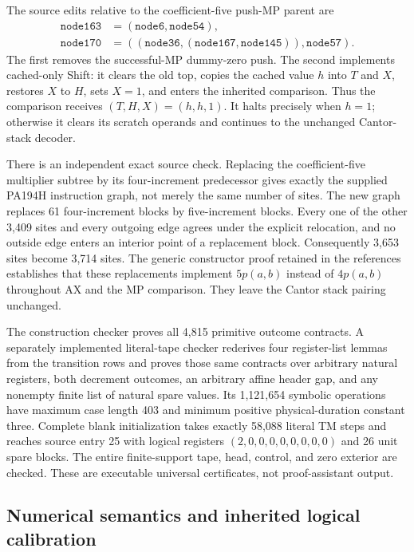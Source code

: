 The source edits relative to the coefficient-five push-MP parent are
\[
\begin{split}
 \mathtt{node163}&=(\mathtt{node6},\mathtt{node54}),\\
 \mathtt{node170}&=((\mathtt{node36},
              (\mathtt{node167},\mathtt{node145})),\mathtt{node57}).
\end{split}
\]
The first removes the successful-MP dummy-zero push.  The second implements
cached-only Shift: it clears the old top, copies the cached value $h$ into
$T$ and $X$, restores $X$ to $H$, sets $X=1$, and enters the inherited
comparison.  Thus the comparison receives $(T,H,X)=(h,h,1)$.
It halts precisely when $h=1$; otherwise it clears its scratch operands
and continues to the unchanged Cantor-stack decoder.

There is an independent exact source check.  Replacing the coefficient-five
multiplier subtree by its four-increment predecessor gives exactly the
supplied PA194H instruction graph, not merely the same number of sites.
The new graph replaces 61 four-increment blocks by five-increment blocks.
Every one of the other 3,409 sites and every outgoing edge agrees under
the explicit relocation, and no outside edge enters an interior point of
a replacement block.  Consequently 3,653 sites become 3,714 sites.
The generic constructor proof retained in the references establishes that
these replacements implement $5p(a,b)$ instead of $4p(a,b)$ throughout AX
and the MP comparison.  They leave the Cantor stack pairing unchanged.

The construction checker proves all 4,815 primitive outcome contracts.
A separately implemented literal-tape checker rederives four register-list
lemmas from the transition rows and proves those same contracts over
arbitrary natural registers, both decrement outcomes, an arbitrary affine
header gap, and any nonempty finite list of natural spare values.  Its
1,121,654 symbolic operations have maximum case length 403 and minimum
positive physical-duration constant three.  Complete blank initialization
takes exactly 58,088 literal TM steps and reaches source entry 25 with
logical registers $(2,0,0,0,0,0,0,0,0)$ and 26 unit spare blocks.  The entire
finite-support tape, head, control, and zero exterior are checked.
These are executable universal certificates, not proof-assistant output.

\subsection{Numerical semantics and inherited logical calibration}

